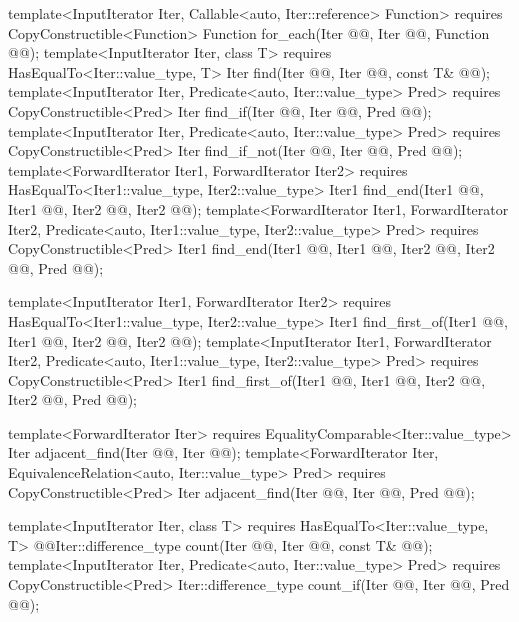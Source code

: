 \documentclass[american,twoside]{book}
\begin{document}
\begin{paras}
\begin{codeblock}
{  template<InputIterator Iter, Callable<auto, Iter::reference> Function>
    requires CopyConstructible<Function>
    Function for_each(Iter @@, Iter @@, Function @@);
  template<InputIterator Iter, class T>
    requires HasEqualTo<Iter::value_type, T>
    Iter find(Iter @@, Iter @@, const T& @@);
  template<InputIterator Iter, Predicate<auto, Iter::value_type> Pred>
    requires CopyConstructible<Pred>
    Iter find_if(Iter @@, Iter @@, Pred @@);
  template<InputIterator Iter, Predicate<auto, Iter::value_type> Pred>
    requires CopyConstructible<Pred>
    Iter find_if_not(Iter @@, Iter @@, Pred @@);
  template<ForwardIterator Iter1, ForwardIterator Iter2>
    requires HasEqualTo<Iter1::value_type, Iter2::value_type>
    Iter1 find_end(Iter1 @@, Iter1 @@,
                   Iter2 @@, Iter2 @@);
  template<ForwardIterator Iter1, ForwardIterator Iter2, 
           Predicate<auto, Iter1::value_type, Iter2::value_type> Pred>
    requires CopyConstructible<Pred>
    Iter1 find_end(Iter1 @@, Iter1 @@,
                   Iter2 @@, Iter2 @@,
                   Pred @@);

  template<InputIterator Iter1, ForwardIterator Iter2>
    requires HasEqualTo<Iter1::value_type, Iter2::value_type>
    Iter1 find_first_of(Iter1 @@, Iter1 @@,
                        Iter2 @@, Iter2 @@);
  template<InputIterator Iter1, ForwardIterator Iter2,
           Predicate<auto, Iter1::value_type, Iter2::value_type> Pred>
    requires CopyConstructible<Pred>
    Iter1 find_first_of(Iter1 @@, Iter1 @@,
                        Iter2 @@, Iter2 @@,
                        Pred @@);

  template<ForwardIterator Iter>
    requires EqualityComparable<Iter::value_type>
    Iter adjacent_find(Iter @@, Iter @@);
  template<ForwardIterator Iter, EquivalenceRelation<auto, Iter::value_type> Pred>
    requires CopyConstructible<Pred>
    Iter adjacent_find(Iter @@, Iter @@, Pred @@);

  template<InputIterator Iter, class T>
    requires HasEqualTo<Iter::value_type, T>
    @\color{addclr}@Iter::difference_type count(Iter @@, Iter @@, const T& @@);
  template<InputIterator Iter, Predicate<auto, Iter::value_type> Pred>
    requires CopyConstructible<Pred>
    Iter::difference_type count_if(Iter @@, Iter @@, Pred @@);

}
\end{codeblock}
\end{paras}
\end{document}
